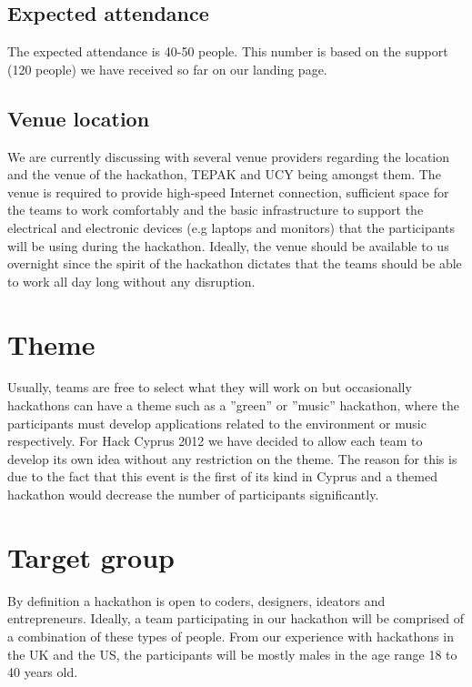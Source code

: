 \documentclass[a4paper,11pt]{report}
\begin{document}
\subsection{Expected attendance}
The expected attendance is 40-50 people. This number is based on the support (120 people) we have received so far on our landing page.
\subsection{Venue location}
We are currently discussing with several venue providers regarding the location and the venue of the hackathon, TEPAK and UCY being amongst them. The venue is required to provide high-speed Internet connection, sufficient space for the teams to work comfortably and the basic infrastructure to support the electrical and electronic devices (e.g laptops and monitors) that the participants will be using during the hackathon. Ideally, the venue should be available to us overnight since the spirit of the hackathon dictates that the teams should be able to work all day long without any disruption. 
 
\section{Theme}
Usually, teams are free to select what they will work on but occasionally hackathons can have a theme such as a ''green'' or ''music'' hackathon, where the participants must develop applications related to the environment or music respectively. For Hack Cyprus 2012 we have decided to allow each team to develop its own idea without any restriction on the theme. The reason for this is due to the fact that this event is the first of its kind in Cyprus and a themed hackathon would decrease the number of participants significantly. 

\section{Target group}
By definition a hackathon is open to coders, designers, ideators and entrepreneurs. Ideally, a team participating in our hackathon will
be comprised of a combination of these types of people. From our experience with hackathons in the UK and the US, the participants will be mostly males in the age range 18 to 40 years old.   
\end{document}
